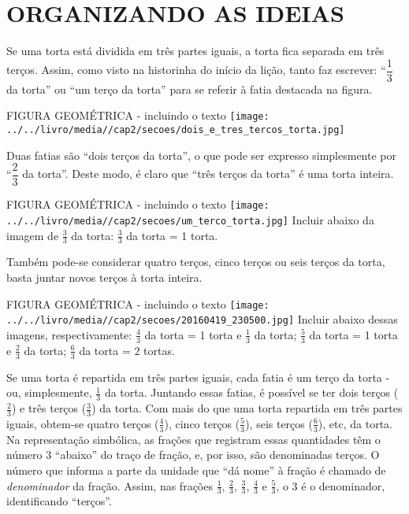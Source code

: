 \documentclass[a4,12pt]{book}
\begin{document}
\section*{ORGANIZANDO AS IDEIAS }








Se uma torta está dividida em três partes iguais, a torta fica separada em três terços. Assim, como visto na historinha do início da lição, tanto faz escrever: ``$\dfrac{1}{3}$ da torta'' ou ``um terço da torta'' para se referir à fatia destacada na figura.

\begin{imagem*}[breakable]{}{}   FIGURA GEOMÉTRICA - incluindo o texto  \mbox{} \newline        \texttt{[image: ../../livro/media//cap2/secoes/dois\_e\_tres\_tercos\_torta.jpg]}\end{imagem*}


Duas fatias são ``dois terços da torta'', o que pode ser expresso simplesmente por ``$\dfrac{2}{3}$ da torta''. Deste modo, é claro que ``três terços da torta'' é uma torta inteira.

\begin{imagem*}[breakable]{}{}   FIGURA GEOMÉTRICA - incluindo o texto  \mbox{} \newline        \texttt{[image: ../../livro/media//cap2/secoes/um\_terco\_torta.jpg]}  
  Incluir abaixo da imagem de   $\frac{3}{3}$   da torta:   $\frac{3}{3}$   da torta = 1 torta.\end{imagem*}

Também pode-se considerar quatro terços, cinco terços ou seis terços da torta, basta juntar novos terços à torta inteira.

\begin{imagem*}[breakable]{}{}    FIGURA GEOMÉTRICA - incluindo o texto  \mbox{} \newline         \texttt{[image: ../../livro/media//cap2/secoes/20160419\_230500.jpg]}  
  Incluir abaixo dessas imagens, respectivamente:  
  $\frac{4}{3}$   da torta = 1 torta e   $\frac{1}{3}$   da torta;  
  $\frac{5}{3}$   da torta = 1 torta e   $\frac{2}{3}$   da torta;  
  $\frac{6}{3}$   da torta = 2 tortas.  
\end{imagem*}



Se uma torta é repartida em três partes iguais, cada fatia é um terço da torta - ou, simplesmente, $\frac{1}{3}$ da torta. Juntando essas fatias, é possível se ter dois terços ($\frac{2}{3}$) e três terços ($\frac{3}{3}$) da torta. Com mais do que uma torta repartida em três partes iguais, obtem-se quatro terços ($\frac{4}{3}$), cinco terços ($\frac{5}{3}$), seis terços ($\frac{6}{3}$), etc, da torta. Na representação simbólica, as frações que registram essas quantidades têm o número 3 ``abaixo'' do traço de fração, e, por isso, são denominadas terços. O número que informa a parte da unidade que ``dá nome'' à fração é chamado de {\it denominador} da fração. Assim, nas frações $\frac{1}{3}$, $\frac{2}{3}$, $\frac{3}{3}$,  $\frac{4}{3}$ e $\frac{5}{3}$, o 3 é o denominador, identificando ``terços''. 
\end{document}
